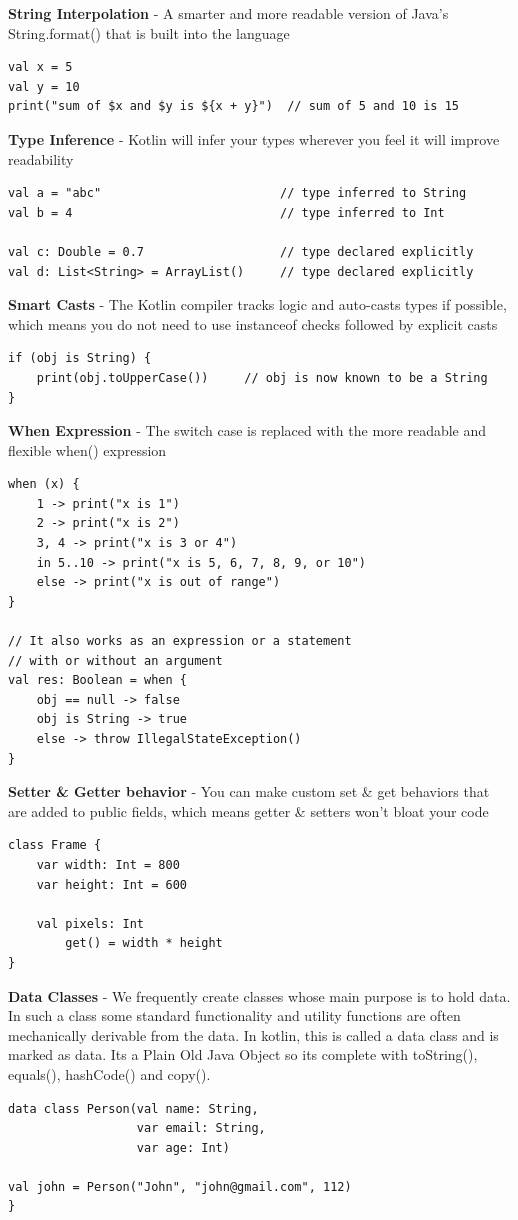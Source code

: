 \textbf{String Interpolation} - A smarter and more readable version of Java's String.format() that is built into the language
\begin{lstlisting}
val x = 5
val y = 10
print("sum of $x and $y is ${x + y}")  // sum of 5 and 10 is 15
\end{lstlisting}

\textbf{Type Inference} - Kotlin will infer your types wherever you feel it will improve readability
\begin{lstlisting}
val a = "abc"                         // type inferred to String
val b = 4                             // type inferred to Int

val c: Double = 0.7                   // type declared explicitly
val d: List<String> = ArrayList()     // type declared explicitly
\end{lstlisting}

\textbf{Smart Casts} - The Kotlin compiler tracks logic and auto-casts types if possible, which means you do not need to use instanceof checks followed by explicit casts
\begin{lstlisting}
if (obj is String) {
    print(obj.toUpperCase())     // obj is now known to be a String
}
\end{lstlisting}

\textbf{When Expression} - The switch case is replaced with the more readable and flexible when() expression
\begin{lstlisting}
when (x) {
    1 -> print("x is 1")
    2 -> print("x is 2")
    3, 4 -> print("x is 3 or 4")
    in 5..10 -> print("x is 5, 6, 7, 8, 9, or 10")
    else -> print("x is out of range")
}

// It also works as an expression or a statement
// with or without an argument
val res: Boolean = when {
    obj == null -> false
    obj is String -> true
    else -> throw IllegalStateException()
}
\end{lstlisting}

\textbf{Setter \& Getter behavior} - You can make custom set \& get behaviors that are added to public fields, which means getter \& setters won't bloat your code
\begin{lstlisting}
class Frame {
    var width: Int = 800
    var height: Int = 600

    val pixels: Int
        get() = width * height
}
\end{lstlisting}

\textbf{Data Classes} - We frequently create classes whose main purpose is to hold data. In such a class some standard functionality and utility functions are often mechanically derivable from the data. In kotlin, this is called a data class and is marked as data. Its a Plain Old Java Object so its complete with toString(), equals(), hashCode() and copy().
\begin{lstlisting}
data class Person(val name: String,
                  var email: String,
                  var age: Int)

val john = Person("John", "john@gmail.com", 112)
}
\end{lstlisting}


